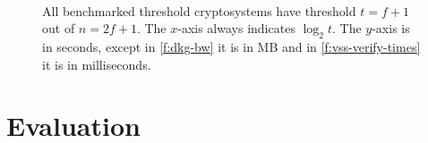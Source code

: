 \begin{figure}
{    }
    \\
    \caption{
        All benchmarked threshold cryptosystems have threshold $t = f+1$ out of $n=2f+1$.
        The $x$-axis always indicates $\log_2{t}$.
        The $y$-axis is in seconds, except in \cref{f:dkg-bw} it is in MB and in \cref{f:vss-verify-times} it is in milliseconds.
    }
\end{figure}

\section{Evaluation}
\label{s:eval}


